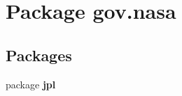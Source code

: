 \section{Package gov.\+nasa}
\label{namespacegov_1_1nasa}
\subsection*{Packages}
\begin{DoxyCompactItemize}
\item 
package {\bf jpl}
\end{DoxyCompactItemize}
